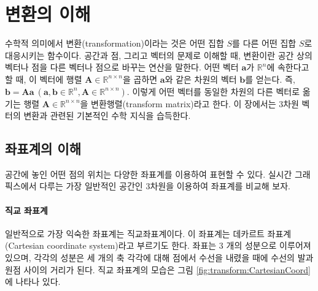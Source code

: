 \renewcommand\chapterillustration{Math_transform/chapterImage}



\chapter{변환의 이해}

수학적 의미에서 변환(transformation)이라는 것은 어떤 집합 $S$를 다른 어떤 집합 $S$로 대응시키는 함수이다. 
공간과 점, 그리고 벡터의 문제로 이해할 때, 변환이란 공간 상의 벡터나 점을 다른 벡터나 점으로 바꾸는 연산을 말한다.
어떤 벡터 $\mathbf a$가 $\mathbb R^{n}$에 속한다고 할 때,
이 벡터에 행렬 $\mathbf A \in \mathbb R^{n \times n}$을 곱하면 $\mathbf a$와 같은 차원의 벡터 $\mathbf b$를 얻는다.
즉,  $\mathbf b = \mathbf A \mathbf a ~ (\mathbf a, \mathbf b \in \mathbb R^n , \mathbf A \in \mathbb R^{n \times n})$.
이렇게 어떤 벡터를 동일한 차원의 다른 벡터로 옮기는 행렬 $\mathbf A \in \mathbb R^{n \times n}$을 변환행렬(transform matrix)라고 한다.
이 장에서는 3차원 벡터의 변환과 관련된 기본적인 수학 지식을 습득한다.

\section{좌표계의 이해}

공간에 놓인 어떤 점의 위치는 다양한 좌표계를 이용하여 표현할 수 있다.
실시간 그래픽스에서 다루는 가장 일반적인 공간인 3차원을 이용하여 좌표계를 비교해 보자.

\subsubsection{직교 좌표계}

일반적으로 가장 익숙한 좌표계는 직교좌표계이다. 이 좌표계는 데카르트 좌표계(Cartesian coordinate system)라고 부르기도 한다.
좌표는 3 개의 성분으로 이루어져 있으며, 각각의 성분은 세 개의 축 각각에 대해 점에서 수선을 내렸을 때에 수선의 발과 원점 사이의 거리가 된다.
직교 좌표계의 모습은 그림 \ref{fig:transform:CartesianCoord}에 나타나 있다.

